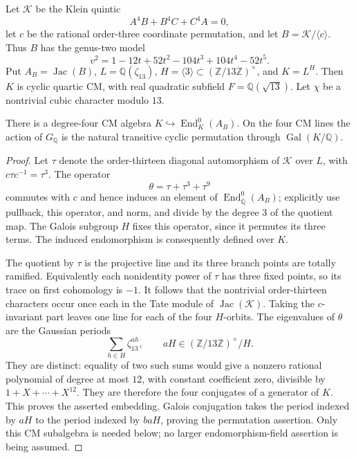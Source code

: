 Let $\mathcal K$ be the Klein quintic
\[
 A^4B+B^4C+C^4A=0,
\]
let $c$ be the rational order-three coordinate permutation, and let
$B=\mathcal K/\langle c\rangle$.  Thus $B$ has the genus-two model
\[
 v^2=1-12t+52t^2-104t^3+104t^4-52t^5.
\]
Put $A_B=\operatorname{Jac}(B)$, $L=\mathbb Q(\zeta_{13})$,
$H=\langle3\rangle\subset(\mathbb Z/13\mathbb Z)^\times$, and
$K=L^H$.  Then $K$ is cyclic quartic CM, with real quadratic subfield
$F=\mathbb Q(\sqrt{13})$.  Let $\chi$ be a nontrivial cubic character
modulo $13$.

\begin{lemma}
\label{lem:lm-thirteen-cm-field}
There is a degree-four CM algebra
$K\hookrightarrow\operatorname{End}^0_K(A_B)$.  On the four CM lines
the action of $G_{\mathbb Q}$ is the natural transitive cyclic
permutation through $\operatorname{Gal}(K/\mathbb Q)$.
\end{lemma}
\begin{proof}
Let $\tau$ denote the order-thirteen diagonal automorphism of
$\mathcal K$ over $L$, with $c\tau c^{-1}=\tau^3$.  The operator
\[
 \theta=\tau+\tau^3+\tau^9
\]
commutes with $c$ and hence induces an element of
$\operatorname{End}^0_{\overline{\mathbb Q}}(A_B)$; explicitly use
pullback, this operator, and norm,
and divide by the degree $3$ of the quotient map.  The Galois
subgroup $H$ fixes this operator, since it permutes its three terms.
The induced endomorphism is consequently defined over $K$.

The quotient by $\tau$ is the projective line and its three branch
points are totally ramified.  Equivalently each nonidentity power of
$\tau$ has three fixed points, so its trace on first cohomology is
$-1$.  It follows that the nontrivial order-thirteen characters
occur once each in the Tate module of
$\operatorname{Jac}(\mathcal K)$.  Taking the
$c$-invariant part leaves one line for each of the four $H$-orbits.
The eigenvalues of $\theta$ are the Gaussian periods
\[
 \sum_{h\in H}\zeta_{13}^{ah},
 \qquad aH\in(\mathbb Z/13\mathbb Z)^\times/H.
\]
They are distinct: equality of two such sums would give a nonzero
rational polynomial of degree at most $12$, with constant coefficient
zero, divisible by $1+X+\cdots+X^{12}$.  They are therefore the four
conjugates of a generator of $K$.  This proves the asserted embedding.
Galois conjugation takes the period indexed by $aH$ to the period
indexed by $baH$, proving the permutation assertion.  Only this CM
subalgebra is needed below; no larger endomorphism-field assertion
is being assumed.
\end{proof}

